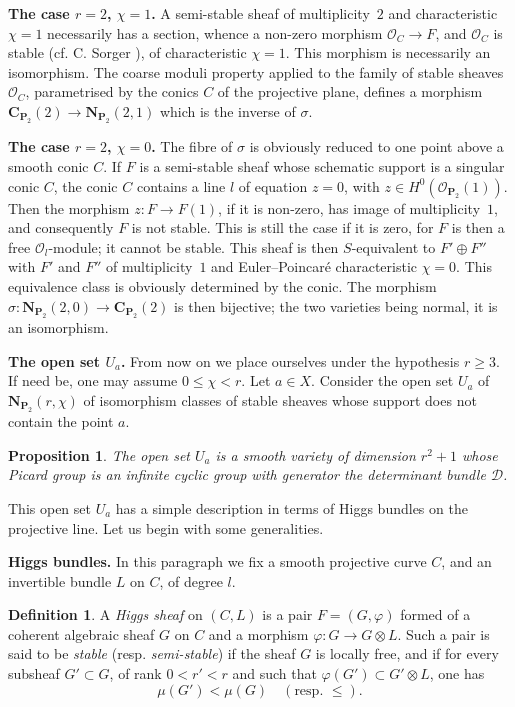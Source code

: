 \documentclass[12pt,english]{smfart}%
\theoremstyle{plain}
\newtheorem{proposition}[theorem]{Proposition}
\theoremstyle{definition}
\newtheorem{definition}[theorem]{Definition}
\theoremstyle{remark}
\newcommand{\PP}{\mathbf{P}}
\newcommand{\Oh}{\mathcal{O}}
\newcommand{\origpage}[1]{\marginnote{\scriptsize\itshape p.~#1}}
\begin{document}
\medskip
\noindent\textbf{The case $r=2$, $\chi=1$.} A semi-stable sheaf of multiplicity~$2$ and characteristic $\chi=1$ necessarily has a section, whence a non-zero morphism $\Oh_{C}\to F$, and $\Oh_{C}$ is stable (cf. C. Sorger \cite{Sor}), of characteristic $\chi=1$. This morphism is necessarily an isomorphism. The coarse moduli property applied to the family of stable sheaves $\Oh_{C}$, parametrised by the conics $C$ of the projective plane, defines a morphism $\mathbf{C}_{\PP_{2}}(2)\to\mathbf{N}_{\PP_{2}}(2,1)$ which is the inverse of $\sigma$.

\medskip
\noindent\textbf{The case $r=2$, $\chi=0$.} The fibre of $\sigma$ is obviously reduced to one point above a smooth conic $C$. If $F$ is a semi-stable sheaf whose schematic support is a singular conic $C$, the conic $C$ contains a line $l$ of equation $z=0$, with $z\in H^{0}(\Oh_{\PP_{2}}(1))$. Then the morphism $z:F\to F(1)$, if it is non-zero, has image of multiplicity~$1$, and consequently $F$ is not stable. This is still the case if it is zero, for $F$ is then a free $\Oh_{l}$-module; it cannot be stable. This sheaf is then $S$-equivalent to $F'\oplus F''$ with $F'$ and $F''$ of multiplicity~$1$ and Euler--Poincar\'e characteristic $\chi=0$. This equivalence class is obviously determined by the conic. The morphism $\sigma:\mathbf{N}_{\PP_{2}}(2,0)\to\mathbf{C}_{\PP_{2}}(2)$ is then bijective; the two varieties being normal, it is an isomorphism.

\medskip
\noindent\textbf{The open set $U_{a}$.} From now on we place ourselves under the hypothesis $r\geq 3$. If need be, one may assume $0\leq\chi<r$. Let $a\in X$. Consider the open set $U_{a}$ of $\mathbf{N}_{\PP_{2}}(r,\chi)$ of isomorphism classes of stable sheaves whose support does not contain the point $a$.

\begin{proposition}\label{prop:Ua}
The open set $U_{a}$ is a smooth variety of dimension $r^{2}+1$ whose Picard group is an infinite cyclic group with generator the determinant bundle $\mathscr{D}$.
\end{proposition}

This open set $U_{a}$ has a simple description in terms of Higgs bundles on the projective line. Let us begin with some generalities.

\medskip
\noindent\textbf{Higgs bundles.} In this paragraph we fix a smooth projective curve $C$, and an invertible bundle $L$ on $C$, of degree $l$.

\begin{definition}\label{def:higgs}
A \emph{Higgs sheaf} on $(C,L)$ is a pair $F=(G,\varphi)$ formed of a coherent algebraic sheaf $G$ on $C$ and a morphism $\varphi:G\to G\otimes L$. Such a pair is said to be \emph{stable} (resp. \emph{semi-stable}) if the
\origpage{647}%
sheaf $G$ is locally free, and if for every subsheaf $G'\subset G$, of rank $0<r'<r$ and such that $\varphi(G')\subset G'\otimes L$, one has
\[
\mu(G') < \mu(G) \quad (\text{resp. } \leq).
\]
\end{definition}
\end{document}
